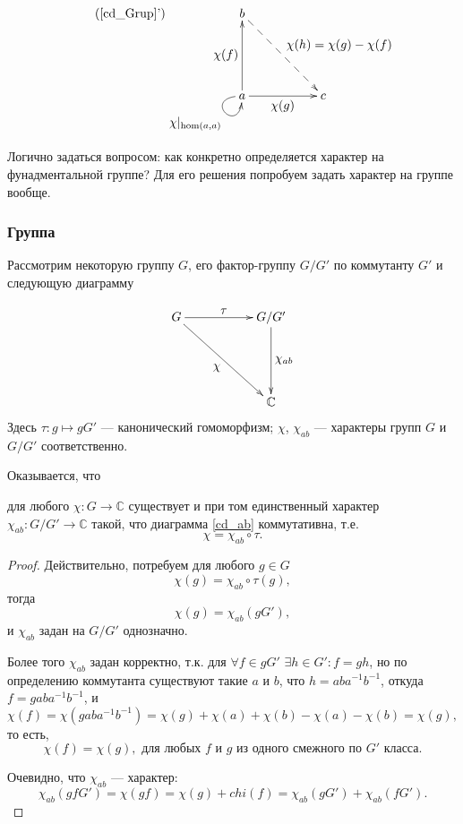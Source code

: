    \begin{equation}\tag{\ref{cd_Grup}'}
        \xymatrix{
            b \ar@{-->}[ddrr]^{\textstyle{\chi(h)=\chi(g)- \chi(f)}}  &  & \\
            & & \\
            a \ar@(l,d)[]_{\textstyle{\chi|_{\hom(a,a)}}} \ar[uu]^{\textstyle{\chi(f)}} \ar[rr]_{\textstyle{\chi(g)}} & & c
        }
    \end{equation}

    \bigskip

    Логично задаться вопросом: как конкретно определяется характер на 
    фунадментальной группе? Для его решения попробуем задать характер на группе 
    вообще.

\subsubsection{Группа}
    Рассмотрим некоторую группу $G$, его фактор-группу $G/G'$ по коммутанту 
    $G'$ и следующую диаграмму

    \begin{equation}\label{cd_ab}
        \xymatrix{
            G \ar[rr]^{\textstyle{\tau}} \ar[rrdd]_{\textstyle{\chi}} & & G/G'\ar[dd]^{\textstyle{\chi_{ab}}} \\
            & & \\
            & & \mathbb{C}
        }
    \end{equation}
    Здесь $\tau: g \mapsto gG'$ --- канонический гомоморфизм; $\chi$, 
    $\chi_{ab}$ --- характеры групп $G$ и $G/G'$ соответственно.

    Оказывается, что 
    \begin{statement} для любого $\chi : G \to \mathbb{C}$ существует и при том 
        единственный характер $\chi_{ab} : G/G' \to \mathbb{C}$ такой, что диаграмма 
        \eqref{cd_ab} коммутативна, т.е. 
        \[\chi = \chi_{ab} \circ \tau.\]
    \end{statement}

    \begin{proof} Действительно, потребуем для любого $g \in G$
    \[\chi(g) = \chi_{ab} \circ \tau (g),\]
    тогда
    \[\chi(g) = \chi_{ab} (gG'),\]
    и $\chi_{ab}$ задан на $G/G'$ однозначно.

    Более того $\chi_{ab}$ задан корректно, т.к. для $\forall f \in gG'$ 
    $\exists h \in G': f = gh$, но по определению коммутанта существуют такие 
    $a$ и $b$, что $h = aba^{-1}b^{-1}$, откуда $f = gaba^{-1}b^{-1}$, и 
    \[\chi(f) = \chi(gaba^{-1}b^{-1}) 
    = \chi(g) + \chi(a) + \chi(b) - \chi(a) - \chi(b) = \chi(g),\]
    то есть,
    \begin{equation}\label{eq_chi_factor}
        \chi(f) = \chi(g),\text{ для любых $f$ и $g$ из одного смежного по $G'$ класса.}
    \end{equation}
    
    Очевидно, что $\chi_{ab}$ --- характер:
    \[\chi_{ab}(gf G') = \chi(gf) = \chi(g) + chi(f) = \chi_{ab}(gG') + \chi_{ab}(fG').\]
    \end{proof}
    
